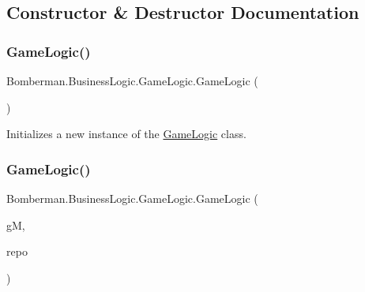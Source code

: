 \subsection{Constructor \& Destructor Documentation}
\mbox{\label{class_bomberman_1_1_business_logic_1_1_game_logic_a14787126f329ddf18b91fb37caac1eee}} 
\subsubsection{\texorpdfstring{GameLogic()}{GameLogic()}\hspace{0.1cm}{\footnotesize\ttfamily [1/2]}}
{\footnotesize\ttfamily Bomberman.\+Business\+Logic.\+Game\+Logic.\+Game\+Logic (\begin{DoxyParamCaption}{ }\end{DoxyParamCaption})\hspace{0.3cm}{\ttfamily [inline]}}



Initializes a new instance of the \mbox{\hyperlink{class_bomberman_1_1_business_logic_1_1_game_logic}{Game\+Logic}} class. 

\mbox{\label{class_bomberman_1_1_business_logic_1_1_game_logic_a4f8cd01b5a5e15e22bdcd912b539aee9}} 
\subsubsection{\texorpdfstring{GameLogic()}{GameLogic()}\hspace{0.1cm}{\footnotesize\ttfamily [2/2]}}
{\footnotesize\ttfamily Bomberman.\+Business\+Logic.\+Game\+Logic.\+Game\+Logic (\begin{DoxyParamCaption}\item[{\mbox{\hyperlink{class_bomberman_1_1_business_logic_1_1_game_model}{Game\+Model}}}]{gM,  }\item[{\mbox{\hyperlink{class_bomberman_1_1_business_logic_1_1_data_base_logic}{Data\+Base\+Logic}}}]{repo }\end{DoxyParamCaption})\hspace{0.3cm}{\ttfamily [inline]}}



